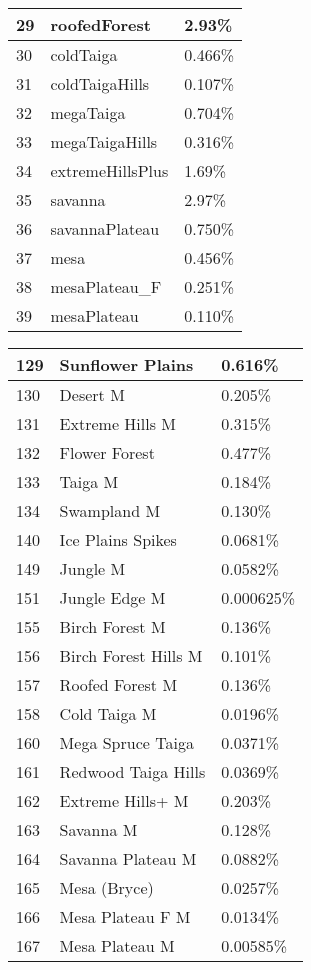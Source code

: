 \documentclass{article}
\begin{document}
\begin{tabular}{|l|l|l|}
		29     & roofedForest        & 2.93\%\\\hline
		30     & coldTaiga           & 0.466\%\\\hline
		31     & coldTaigaHills      & 0.107\%\\\hline
		32     & megaTaiga           & 0.704\%\\\hline
		33     & megaTaigaHills      & 0.316\%\\\hline
		34     & extremeHillsPlus    & 1.69\%\\\hline
		35     & savanna             & 2.97\%\\\hline
		36     & savannaPlateau      & 0.750\%\\\hline
		37     & mesa                & 0.456\%\\\hline
		38     & mesaPlateau\_F      & 0.251\%\\\hline
		39     & mesaPlateau         & 0.110\%\\\hline
	\end{tabular}
	\newpage\noindent
	\begin{tabular}{|l|l|l|}\hline
		129    & Sunflower Plains     & 0.616\%\\\hline
		130    & Desert M             & 0.205\%\\\hline
		131    & Extreme Hills M      & 0.315\%\\\hline
		132    & Flower Forest        & 0.477\%\\\hline
		133    & Taiga M              & 0.184\%\\\hline
		134    & Swampland M          & 0.130\%\\\hline
		140    & Ice Plains Spikes    & 0.0681\%\\\hline
		149    & Jungle M             & 0.0582\%\\\hline
		151    & Jungle Edge M        & 0.000625\%\\\hline
		155    & Birch Forest M       & 0.136\%\\\hline
		156    & Birch Forest Hills M & 0.101\%\\\hline
		157    & Roofed Forest M      & 0.136\%\\\hline
		158    & Cold Taiga M         & 0.0196\%\\\hline
		160    & Mega Spruce Taiga    & 0.0371\%\\\hline
		161    & Redwood Taiga Hills  & 0.0369\%\\\hline
		162    & Extreme Hills+ M     & 0.203\%\\\hline
		163    & Savanna M            & 0.128\%\\\hline
		164    & Savanna Plateau M    & 0.0882\%\\\hline
		165    & Mesa (Bryce)         & 0.0257\%\\\hline
		166    & Mesa Plateau F M     & 0.0134\%\\\hline
		167    & Mesa Plateau M       & 0.00585\%\\\hline
	\end{tabular}
	
\end{document}
